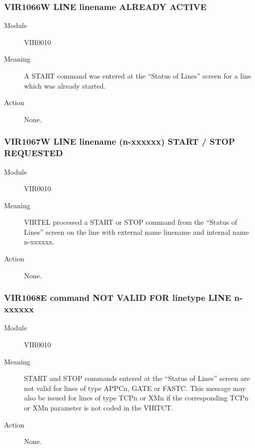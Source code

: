 \documentclass[letterpaper,10pt,english]{sphinxmanual}
\begin{document}
\subsubsection{VIR1066W LINE linename ALREADY ACTIVE}
\label{\detokenize{messages:vir1066w-line-linename-already-active}}\begin{description}
\item[{Module}] \leavevmode
VIR0010

\item[{Meaning}] \leavevmode
A START command was entered at the “Status of Lines” screen for a line which was already started.

\item[{Action}] \leavevmode
None.

\end{description}


\subsubsection{VIR1067W LINE linename (n-xxxxxx) START / STOP REQUESTED}
\label{\detokenize{messages:vir1067w-line-linename-n-xxxxxx-start-stop-requested}}\begin{description}
\item[{Module}] \leavevmode
VIR0010

\item[{Meaning}] \leavevmode
VIRTEL processed a START or STOP command from the “Status of Lines” screen on the line with external name linename and internal name n-xxxxxx.

\item[{Action}] \leavevmode
None.

\end{description}


\subsubsection{VIR1068E command NOT VALID FOR linetype LINE n-xxxxxx}
\label{\detokenize{messages:vir1068e-command-not-valid-for-linetype-line-n-xxxxxx}}\begin{description}
\item[{Module}] \leavevmode
VIR0010

\item[{Meaning}] \leavevmode
START and STOP commands entered at the “Status of Lines” screen are not valid for lines of type APPCn, GATE or FASTC. This message may also be issued for lines of type TCPn or XMn if the corresponding TCPn or XMn parameter is not coded in the VIRTCT.

\item[{Action}] \leavevmode
None.

\end{description}
\end{document}
